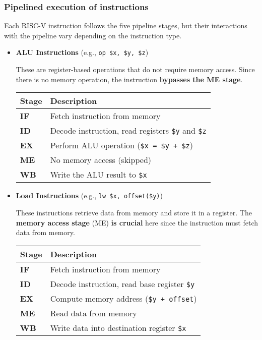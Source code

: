 \subsubsection{Pipelined execution of instructions}

Each RISC-V instruction follows the five pipeline stages, but their interactions with the pipeline vary depending on the instruction type.
\begin{itemize}
   \item \textbf{ALU Instructions} (e.g., \texttt{op \$x, \$y, \$z})

   These are register-based operations that do not require memory access. Since there is no memory operation, the instruction \textbf{bypasses the ME stage}.

   \begin{table}[!htp]
      \centering
      \begin{tabular}{@{} l l @{}}
         \toprule
         \textbf{Stage} & \textbf{Description} \\
         \midrule
         \textbf{IF} & Fetch instruction from memory \\ [.3em]
         \textbf{ID} & Decode instruction, read registers \texttt{\$y} and \texttt{\$z} \\ [.3em]
         \textbf{EX} & Perform ALU operation (\texttt{\$x = \$y + \$z}) \\ [.3em]
         \textbf{ME} & No memory access (skipped) \\ [.3em]
         \textbf{WB} & Write the ALU result to \texttt{\$x} \\
         \bottomrule
      \end{tabular}
   \end{table}


   \item \textbf{Load Instructions} (e.g., \texttt{lw \$x, offset(\$y)})

   These instructions retrieve data from memory and store it in a register. The \textbf{memory access stage} (ME) \textbf{is crucial} here since the instruction must fetch data from memory.

   \begin{table}[!htp]
      \centering
      \begin{tabular}{@{} l l @{}}
         \toprule
         \textbf{Stage} & \textbf{Description} \\
         \midrule
         \textbf{IF} & Fetch instruction from memory \\ [.3em]
         \textbf{ID} & Decode instruction, read base register \texttt{\$y} \\ [.3em]
         \textbf{EX} & Compute memory address (\texttt{\$y + offset}) \\ [.3em]
         \textbf{ME} & Read data from memory \\ [.3em]
         \textbf{WB} & Write data into destination register \texttt{\$x} \\
         \bottomrule
      \end{tabular}
   \end{table}



\end{itemize}
